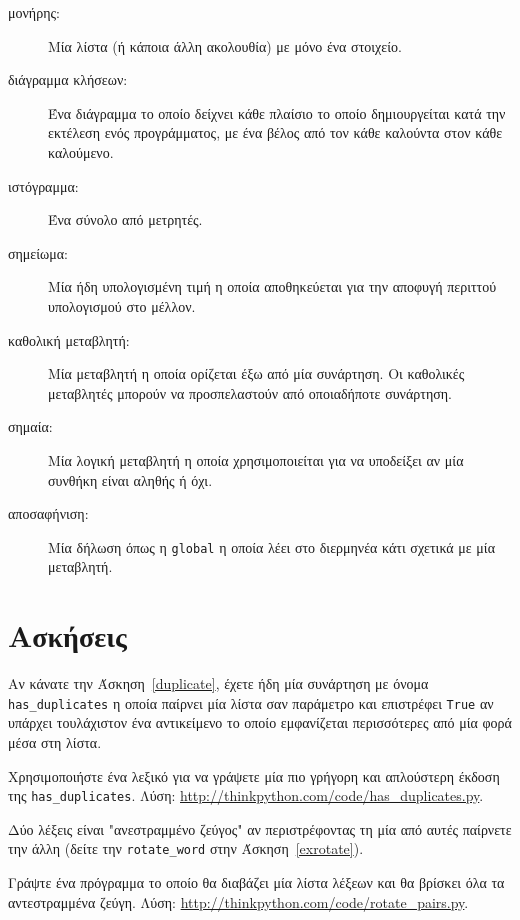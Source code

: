 \documentclass[10pt]{book}
\begin{document}
\begin{description}
\item[μονήρης:] Μία λίστα (ή κάποια άλλη ακολουθία) με μόνο ένα στοιχείο.

\item[διάγραμμα κλήσεων:] Ένα διάγραμμα το οποίο δείχνει κάθε πλαίσιο το οποίο δημιουργείται κατά την εκτέλεση ενός προγράμματος, με ένα βέλος από τον κάθε καλούντα στον κάθε καλούμενο.

\item[ιστόγραμμα:] Ένα σύνολο από μετρητές.

\item[σημείωμα:] Μία ήδη υπολογισμένη τιμή η οποία αποθηκεύεται για την αποφυγή περιττού υπολογισμού στο μέλλον.

\item[καθολική μεταβλητή:] Μία μεταβλητή η οποία ορίζεται έξω από μία συνάρτηση. Οι καθολικές μεταβλητές μπορούν να προσπελαστούν από οποιαδήποτε συνάρτηση.

\item[σημαία:] Μία λογική μεταβλητή η οποία χρησιμοποιείται για να υποδείξει αν μία συνθήκη είναι αληθής ή όχι.

\item[αποσαφήνιση:] Μία δήλωση όπως η {\tt global} η οποία λέει στο διερμηνέα κάτι σχετικά με μία μεταβλητή.

\end{description}

 
\section{Ασκήσεις}

\begin{exercise}

Αν κάνατε την Άσκηση~\ref{duplicate}, έχετε ήδη μία συνάρτηση με όνομα  \verb"has_duplicates" η οποία παίρνει μία λίστα σαν παράμετρο και επιστρέφει  {\tt True} αν υπάρχει τουλάχιστον ένα αντικείμενο το οποίο εμφανίζεται περισσότερες από μία φορά μέσα στη λίστα.

Χρησιμοποιήστε ένα λεξικό για να γράψετε μία πιο γρήγορη και απλούστερη έκδοση της \verb"has_duplicates". Λύση: \url{http://thinkpython.com/code/has_duplicates.py}.
\\
\end{exercise}


\begin{exercise}
\label{exrotatepairs}

Δύο λέξεις είναι "ανεστραμμένο ζεύγος" αν περιστρέφοντας τη μία από αυτές παίρνετε την άλλη (δείτε την \verb"rotate_word" στην Άσκηση~\ref{exrotate}).

Γράψτε ένα πρόγραμμα το οποίο θα διαβάζει μία λίστα λέξεων και θα βρίσκει όλα τα αντεστραμμένα ζεύγη. Λύση: \url{http://thinkpython.com/code/rotate_pairs.py}.
\\
\end{exercise}
\end{document}
